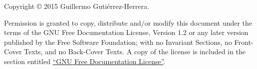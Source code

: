 \documentclass[a4paper,11pt,twoside,headsepline]{scrbook}
\title{\pfctitle}
\author{\pfcauthor}
\date{\pfcdate}
\theoremstyle{definition}
\theoremstyle{definition}
\begin{document}
\frontmatter

\clearpage


\cleardoublepage
{}
\thispagestyle{plain}
\begin{minipage}[l]{0.75\textwidth}
\vskip 15cm
\raggedright
\small
Copyright \copyright{}  2015 Guillermo Gutiérrez-Herrera.
\vspace{\baselineskip}

Permission is granted to copy, distribute and/or modify this document
under the terms of the GNU Free Documentation License, Version 1.2
or any later version published by the Free Software Foundation;
with no Invariant Sections, no Front-Cover Texts, and no Back-Cover
Texts.  A copy of the license is included in the section entitled \hyperref[label_fdl]{``GNU
Free Documentation License''}.
\end{minipage}

\cleardoublepage


\cleardoublepage
\tableofcontents

\mainmatter





\backmatter

\nocite{*}
\printbibliography[heading=bibintoc,title=\bibname]


\cleardoublepage
{}
{}
\listoftables

\cleardoublepage
{}
{}
\listoffigures

\cleardoublepage
{}
{}
\listoflistings

\cleardoublepage
{}
{}
\listofSRSActor

\cleardoublepage
{}
{}
\listofSRSObj

\cleardoublepage
{}
{}
\listofSRSIrq

\cleardoublepage
{}
{}
\listofSRSUc

\cleardoublepage
{}
{}
\listofSRSNfr

\cleardoublepage
{}
{}
\printindex


\end{document}
